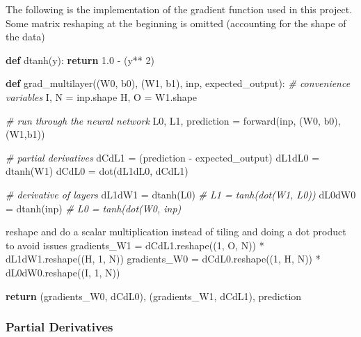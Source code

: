 \documentclass[]{article}
\newenvironment{Shaded}{}{}
\newcommand{\KeywordTok}[1]{\textcolor[rgb]{0.00,0.44,0.13}{\textbf{{#1}}}}
\newcommand{\DecValTok}[1]{\textcolor[rgb]{0.25,0.63,0.44}{{#1}}}
\newcommand{\FloatTok}[1]{\textcolor[rgb]{0.25,0.63,0.44}{{#1}}}
\newcommand{\CommentTok}[1]{\textcolor[rgb]{0.38,0.63,0.69}{\textit{{#1}}}}
\newcommand{\ControlFlowTok}[1]{\textcolor[rgb]{0.00,0.44,0.13}{\textbf{{#1}}}}
\newcommand{\OperatorTok}[1]{\textcolor[rgb]{0.40,0.40,0.40}{{#1}}}
\newcommand{\NormalTok}[1]{{#1}}
\begin{document}
The following is the implementation of the gradient function used in
this project. Some matrix reshaping at the beginning is omitted
(accounting for the shape of the data)

\begin{Shaded}
	\begin{Highlighting}[]
		\KeywordTok{def} \NormalTok{dtanh(y):}
		\ControlFlowTok{return} \FloatTok{1.0} \OperatorTok{-} \NormalTok{(y}\OperatorTok{**} \DecValTok{2}\NormalTok{)}
		
		\KeywordTok{def} \NormalTok{grad_multilayer((W0, b0), (W1, b1), inp, expected_output):}
		\CommentTok{# convenience variables}
		\NormalTok{I, N }\OperatorTok{=} \NormalTok{inp.shape}
		\NormalTok{H, O }\OperatorTok{=} \NormalTok{W1.shape}
		
		\CommentTok{# run through the neural network}
		\NormalTok{L0, L1, prediction }\OperatorTok{=} \NormalTok{forward(inp, (W0, b0), (W1,b1))}
		
		\CommentTok{# partial derivatives }
		\NormalTok{dCdL1 }\OperatorTok{=} \NormalTok{(prediction }\OperatorTok{-} \NormalTok{expected_output)}
		\NormalTok{dL1dL0 }\OperatorTok{=} \NormalTok{dtanh(W1)}
		\NormalTok{dCdL0 }\OperatorTok{=} \NormalTok{dot(dL1dL0, dCdL1)}
		
		\CommentTok{# derivative of layers}
		\NormalTok{dL1dW1 }\OperatorTok{=} \NormalTok{dtanh(L0)  }\CommentTok{# L1 = tanh(dot(W1, L0))}
		\NormalTok{dL0dW0 }\OperatorTok{=} \NormalTok{dtanh(inp) }\CommentTok{# L0 = tanh(dot(W0, inp)}
		
		\NormalTok{reshape }\OperatorTok{and} \NormalTok{do a scalar multiplication instead of tiling }\OperatorTok{and} \NormalTok{doing a dot product to avoid issues}
		\NormalTok{gradients_W1 }\OperatorTok{=} \NormalTok{dCdL1.reshape((}\DecValTok{1}\NormalTok{, O, N)) }\OperatorTok{*} \NormalTok{dL1dW1.reshape((H, }\DecValTok{1}\NormalTok{, N))}
		\NormalTok{gradients_W0 }\OperatorTok{=} \NormalTok{dCdL0.reshape((}\DecValTok{1}\NormalTok{, H, N)) }\OperatorTok{*} \NormalTok{dL0dW0.reshape((I, }\DecValTok{1}\NormalTok{, N))}
		
		\ControlFlowTok{return} \NormalTok{(gradients_W0, dCdL0), (gradients_W1, dCdL1), prediction}
	\end{Highlighting}
\end{Shaded}

\subsubsection{Partial Derivatives}\label{partial-derivatives}
\end{document}
